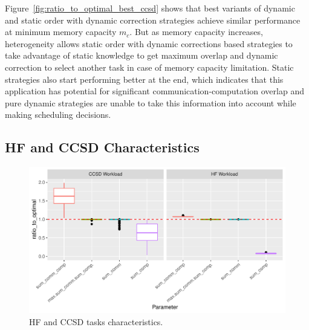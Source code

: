 \documentclass[sigconf]{acmart}
\begin{document}
{		Figure~\ref{fig:ratio_to_optimal_best_ccsd} shows that best variants of dynamic and static order with dynamic correction strategies achieve similar performance at minimum memory capacity $m_c$. But as memory capacity increases, heterogeneity allows static order with dynamic corrections based strategies to take advantage of static knowledge to get maximum overlap and dynamic correction to select another task in case of memory capacity limitation. Static strategies also start performing better at the end, which indicates that this application has potential for significant communication-computation overlap and pure dynamic strategies are unable to take this information into account while making scheduling decisions.
		
		\subsection{HF and CCSD Characteristics}
		
		
		\begin{figure}[htb]
			\includegraphics[scale=0.5]{./results/plots/application_properties.pdf}
			\caption{HF and CCSD tasks characteristics.}
			\label{fig:ApplicationProperties}
		\end{figure}	
		
}
\end{document}
